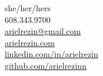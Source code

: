 \documentclass[]{hieudo-build}
\begin{document}
%
%
{
	\faTransgender \hspace{3 pt} {she/her/hers}\\
	\faPhone \hspace{3 pt} {608.343.9700}\\
	\faEnvelope \hspace{3 pt} \href{mailto:arielrezin@gmail.com}{arielrezin@gmail.com}\\
}
{
	\faGlobe \hspace{3 pt} \href{https://arielrezin.com}{arielrezin.com}\\
	\faLinkedin \hspace{3 pt} \href{https://linkedin.com/in/arielrezin}{linkedin.com/in/arielrezin}\\
	\faGithub \hspace{3 pt} \href{https://github.com/arielrezinn}{github.com/arielrezinn}\\
}
    
\end{document}
